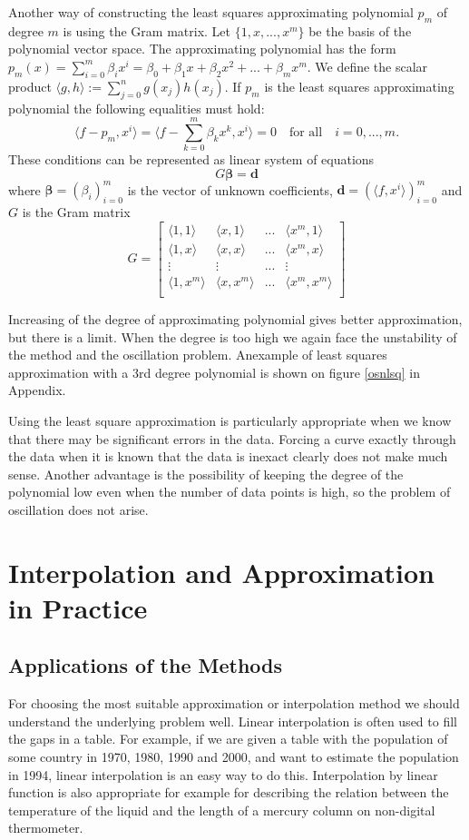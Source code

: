\documentclass[a4paper,10pt]{article}
\begin{document}
Another way of constructing the least squares approximating polynomial $p_m$ of degree $m$ is using the Gram matrix. Let $\{1,x,...,x^m\}$ be the basis of the polynomial vector space. The approximating polynomial has the form $p_m(x)=\sum_{i=0}^{m}\beta_ix^i=\beta_0+\beta_1x+\beta_2x^2+...+\beta_mx^m$.
We define the scalar product $\langle g,h\rangle:=\sum_{j=0}^{n}g(x_j)h(x_j)$.
If $p_m$ is the least squares approximating polynomial the following equalities must hold:
$$\langle f-p_m,x^i\rangle=\langle f-\sum_{k=0}^{m}\beta_kx^k,x^i\rangle=0 \quad \text{for all} \quad i=0,...,m.$$
These conditions can be represented as linear system of equations $$G\boldsymbol{\beta}=\textbf{d}$$ where $\boldsymbol{\beta}=(\beta_i)_{i=0}^{m}$ is the vector of unknown coefficients, $\textbf{d}=(\langle f,x^i \rangle)_{i=0}^{m}$ and $G$ is the Gram matrix
\[
G=
  \begin{bmatrix}
    \langle 1,1 \rangle &  \langle x,1 \rangle & ... &  \langle x^m,1 \rangle \\
     \langle 1,x \rangle &  \langle x,x \rangle& ... &  \langle x^m,x \rangle \\
\vdots & \vdots & ... & \vdots \\
 \langle 1,x^m \rangle & \langle x,x^m \rangle  & ... & \langle x^m,x^m \rangle \\
  \end{bmatrix}
\]
 

Increasing of the degree of approximating polynomial gives better approximation, but there is a limit. When the degree is too high we again face the unstability of the method and the oscillation problem.
Anexample of least squares approximation with a 3rd degree polynomial is shown on figure \ref{osnlsq} in Appendix. \cite{marjetka}

Using the least square approximation is particularly appropriate
when we know that there may be significant errors in the data. Forcing a curve
exactly through the data when it is known that the data is inexact clearly does not
make much sense.
Another advantage is the possibility of keeping the degree of the polynomial low even when
the number of data points is high, so the problem of oscillation does not arise. \cite{Woodford}

\section{Interpolation and Approximation in Practice}
\subsection{Applications of the Methods}
For choosing the most suitable approximation or interpolation method we should understand the underlying problem well.
Linear interpolation is often used to fill the gaps in a table. For example, if we are given a table with the population of some country in 1970, 1980, 1990 and 2000, and want to estimate the population in 1994, linear interpolation is an easy way to do this. Interpolation by linear function is also appropriate for example for describing the relation between the temperature of the liquid and the length of a mercury column on non-digital thermometer. \cite{Woodford}
\end{document}
